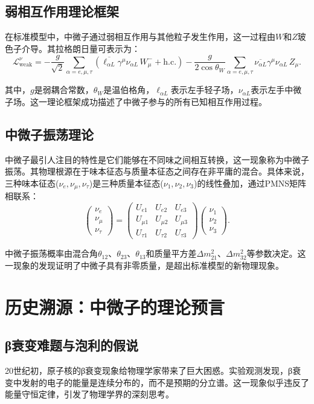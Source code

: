 \documentclass[12pt, a4paper]{article}
\begin{document}
\subsection{弱相互作用理论框架}
在标准模型中，中微子通过弱相互作用与其他粒子发生作用，这一过程由$W$和$Z$玻色子介导。其拉格朗日量可表示为：
$$\mathcal{L}_{\text{weak}}^\nu = -\frac{g}{\sqrt{2}} \sum_{\alpha=e,\mu,\tau} \left( \overline{\ell_{\alpha L}} \gamma^\mu \nu_{\alpha L}\, W^-_\mu + \text{h.c.} \right) -\frac{g}{2\cos\theta_W} \sum_{\alpha=e,\mu,\tau} \overline{\nu_{\alpha L}} \gamma^\mu \nu_{\alpha L}\, Z_\mu.$$

其中，$g$是弱耦合常数，$\theta_W$是温伯格角，$\ell_{\alpha L}$表示左手轻子场，$\nu_{\alpha L}$表示左手中微子场。这一理论框架成功描述了中微子参与的所有已知相互作用过程。

\subsection{中微子振荡理论}
中微子最引人注目的特性是它们能够在不同味之间相互转换，这一现象称为中微子振荡。其物理根源在于味本征态与质量本征态之间存在非平庸的混合。具体来说，三种味本征态($\nu_e, \nu_\mu, \nu_\tau$)是三种质量本征态($\nu_1, \nu_2, \nu_3$)的线性叠加，通过PMNS矩阵相联系：
\[
\begin{pmatrix} \nu_e \\ \nu_\mu \\ \nu_\tau \end{pmatrix} = 
\begin{pmatrix} U_{e1} & U_{e2} & U_{e3} \\ U_{\mu1} & U_{\mu2} & U_{\mu3} \\ U_{\tau1} & U_{\tau2} & U_{\tau3} \end{pmatrix}
\begin{pmatrix} \nu_1 \\ \nu_2 \\ \nu_3 \end{pmatrix}.
\]

中微子振荡概率由混合角$\theta_{12}$、$\theta_{23}$、$\theta_{13}$和质量平方差$\Delta m^2_{21}$、$\Delta m^2_{32}$等参数决定。这一现象的发现证明了中微子具有非零质量，是超出标准模型的新物理现象。

\section{历史溯源：中微子的理论预言}
\subsection{β衰变难题与泡利的假说}
20世纪初，原子核的β衰变现象给物理学家带来了巨大困惑。实验观测发现，β衰变中发射的电子的能量是连续分布的，而不是预期的分立谱。这一现象似乎违反了能量守恒定律，引发了物理学界的深刻思考。
\end{document}

